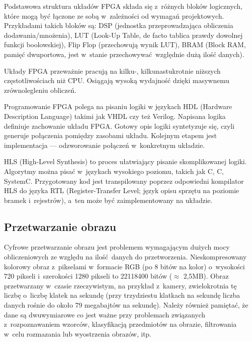 \documentclass[12pt, oneside, a4paper]{article}
\def\CPP{{C\nolinebreak[4]\hspace{-.05em}\raisebox{.4ex}{\tiny\bf ++}}}
\begin{document}
Podstawowa struktura układów FPGA składa się z~różnych bloków logicznych,
które mogą być łączone ze sobą w~zależności od wymagań projektowych.
Przykładami takich bloków są:
DSP (jednostka przeprowadzająca obliczenia dodawania/mnożenia),
LUT (Look-Up Table, de facto tablica prawdy dowolnej funkcji boolowskiej),
Flip Flop (przechowują wynik LUT), BRAM (Block RAM, pamięć dwuportowa,
jest w~stanie przechowywać względnie dużą ilość danych).

Układy FPGA przeważnie pracują na kilku-, kilkunastukrotnie niższych
częstotliwościach niż CPU. Osiągają wysoką wydajność
dzięki masywnemu zrównolegleniu obliczeń.

Programowanie FPGA polega na pisaniu logiki
w językach HDL (Hardware Description Language) takimi jak VHDL 
czy też Verilog. Napisana logika definiuje zachowanie układu FPGA.
Gotowy opis logiki syntetyzuje się, czyli generuje połączenia pomiędzy
zasobami układu. Kolejnym etapem jest implementacja --- odzworowanie
połączeń w~konkretnym układzie.
 
HLS (High-Level Synthesis) to proces ułatwiający pisanie skomplikowanej
logiki. Algorytmy można pisać w~językach wysokiego poziomu, takich jak
C, \CPP, SystemC. Przygotowany kod jest transpilowany poprzez odpowiedni
kompilator HLS do języka RTL (Register-Transfer Level; język opisu sprzętu
na poziomie bramek i~rejestrów), a~ten może być zaimplementowany na układzie.

\subsection{Przetwarzanie obrazu}
Cyfrowe przetwarzanie obrazu jest problemem wymagającym dużych mocy
obliczeniowych ze względu na ilość danych do przetworzenia. Nieskompresowany
kolorowy obraz z~pikselami w~formacie RGB (po 8 bitów na kolor) o~wysokości
720 pikseli i~szerokości 1280 pikseli to 22118400 bitów (\(\approx \) 2,5MB). Obraz
przetwarzany w~czasie rzeczywistym, na przykład z~kamery, zwielokrotnia tę
liczbę o~liczbę klatek na sekundę (przy trzydziestu klatkach na sekundę liczba
danych rośnie do około 79 megabajtów na sekundę). Należy również pamiętać, że
dane są dwuwymiarowe co jest ważne przy problemach związanych z~rozpoznawaniem
wzorców, klasyfikacją przedmiotów na obrazie, filtrowania w~celu rozmazania lub
wyostrzenia obrazów, itp.
\end{document}
